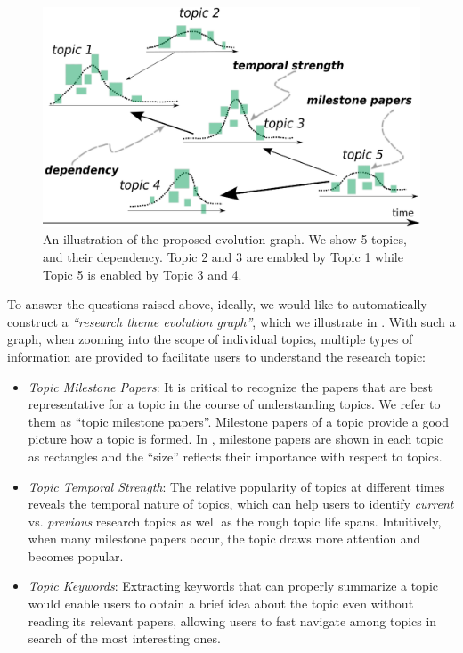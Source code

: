 \begin{figure}[h!]
  \begin{center}
    \includegraphics[scale= .6]{citation-lda/plot/fake_theme.eps}
  \end{center}
  \caption{An illustration of the proposed evolution graph. We show 5 topics,
  and their dependency. Topic 2 and 3 are enabled by Topic 1 while Topic 5 is
  enabled by Topic 3 and 4.}
  \label{fig::fake}
\end{figure}

To answer the questions raised above, ideally, we would like to automatically
construct a \emph{``research theme evolution graph''}, which we illustrate in
.  With such a graph, when zooming into the scope of individual
topics, multiple types of information are provided to facilitate users to
understand the research topic:

\begin{itemize}
\item \emph{Topic Milestone Papers}: It is critical to recognize the papers that
  are best representative for a topic in the course of understanding topics. We
  refer to them as ``topic milestone papers''. Milestone papers of a topic
  provide a good picture how a topic is formed. In , milestone
  papers are shown in each topic as rectangles and the ``size'' reflects their
  importance with respect to topics.
\item \emph{Topic Temporal Strength}: The relative popularity of topics at
  different times reveals the temporal nature of topics, which can help users to
  identify \emph{current} vs. \emph{previous} research topics as well as the
  rough topic life spans. Intuitively, when many milestone papers occur, the
  topic draws more attention and becomes popular.
\item \emph{Topic Keywords}: Extracting keywords that can properly summarize a
  topic would enable users to obtain a brief idea about the topic even without
  reading its relevant papers, allowing users to fast navigate among topics in
  search of the most interesting ones.
\end{itemize}

